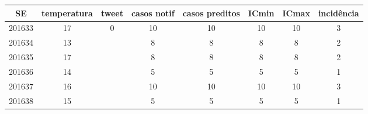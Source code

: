\begin{tabular}{c|ccccccc}
  \hline
SE & temperatura & tweet & casos notif & casos preditos & ICmin & ICmax & incidência \\ 
  \hline
201633 & 17 & 0 & 10 & 10 & 10 & 10 & 3 \\ 
  201634 & 13 &  & 8 & 8 & 8 & 8 & 2 \\ 
  201635 & 17 &  & 8 & 8 & 8 & 8 & 2 \\ 
  201636 & 14 &  & 5 & 5 & 5 & 5 & 1 \\ 
  201637 & 16 &  & 10 & 10 & 10 & 10 & 3 \\ 
  201638 & 15 &  & 5 & 5 & 5 & 5 & 1 \\ 
   \hline
\end{tabular}
